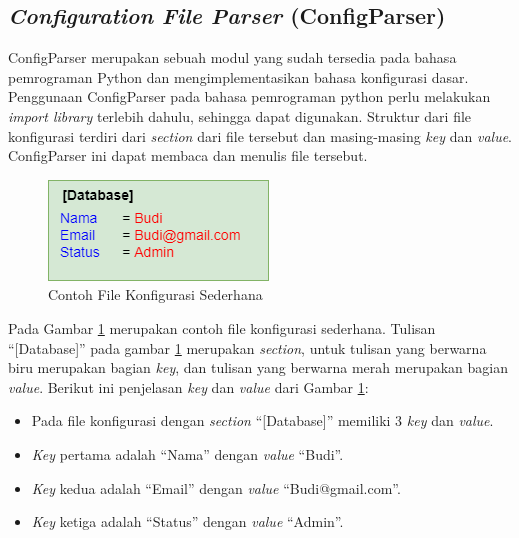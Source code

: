 \subsection{\textit{Configuration File Parser} (ConfigParser)}
ConfigParser merupakan sebuah modul yang sudah tersedia pada bahasa pemrograman Python dan mengimplementasikan bahasa konfigurasi dasar\cite{parser}. Penggunaan ConfigParser pada bahasa pemrograman python perlu melakukan \textit{import library} terlebih dahulu, sehingga dapat digunakan. Struktur dari file konfigurasi terdiri dari \textit{section} dari file tersebut dan masing-masing \textit{key} dan \textit{value}. ConfigParser ini dapat membaca dan menulis file tersebut. 
\begin{figure}[H]
	\centering
	\includegraphics[scale=0.7]{Gambar/config.png}
	\caption{Contoh File Konfigurasi Sederhana} 
	\label{fig:config}
\end{figure}
Pada Gambar \ref{fig:config} merupakan contoh file konfigurasi sederhana. Tulisan ``[Database]'' pada gambar \ref{fig:config} merupakan \textit{section}, untuk tulisan yang berwarna biru merupakan bagian \textit{key}, dan tulisan yang berwarna merah merupakan bagian \textit{value}. Berikut ini penjelasan \textit{key} dan \textit{value} dari Gambar \ref{fig:config}:
\begin{itemize}
	\item Pada file konfigurasi dengan \textit{section} ``[Database]'' memiliki 3 \textit{key} dan \textit{value}.
	\item \textit{Key} pertama adalah ``Nama'' dengan \textit{value} ``Budi''.
	\item \textit{Key} kedua adalah ``Email'' dengan \textit{value} ``Budi@gmail.com''.
	\item \textit{Key} ketiga adalah ``Status'' dengan \textit{value} ``Admin''.
\end{itemize}

